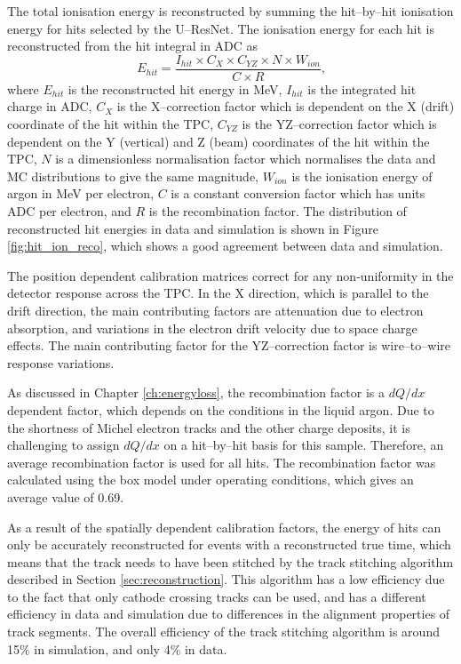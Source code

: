 The total ionisation energy is reconstructed by summing the hit--by--hit
ionisation energy for hits selected by the U--ResNet. The ionisation energy for
each hit is reconstructed from the hit integral in ADC as
\begin{equation*}
	E_{hit} = \frac{I_{hit} \times C_X \times C_{YZ} \times N \times W_{ion}}{C \times R}\mbox{,}
\end{equation*}
where $E_{hit}$ is the reconstructed hit energy in MeV, $I_{hit}$ is the
integrated hit charge in ADC, $C_X$ is the X--correction factor which is
dependent on the X (drift) coordinate of the hit within the TPC, $C_{YZ}$ is the
YZ--correction factor which is dependent on the Y (vertical) and Z (beam) 
coordinates of the hit within the TPC, $N$ is a dimensionless normalisation 
factor which normalises the data and MC distributions to give the same 
magnitude, $W_{ion}$ is the ionisation energy of argon in MeV per electron, 
$C$ is a constant conversion factor which has units ADC per electron, and $R$ 
is the recombination factor. The distribution of reconstructed hit energies in 
\protodune{} data and simulation is shown in Figure \ref{fig:hit_ion_reco}, 
which shows a good agreement between data and simulation.

The position dependent calibration matrices correct for any non-uniformity in 
the detector response across the TPC. In the X direction, which is parallel to 
the drift direction, the main contributing factors are attenuation due to 
electron absorption, and variations in the electron drift velocity due to 
space charge effects. The main contributing factor for the YZ--correction 
factor is wire--to--wire response variations.

As discussed in Chapter \ref{ch:energyloss}, the recombination factor is a
$dQ/dx$ dependent factor, which depends on the conditions in the liquid
argon. Due to the shortness of Michel electron tracks and the other charge
deposits, it is challenging to assign $dQ/dx$ on a hit--by--hit basis for this
sample. Therefore, an average recombination factor is used for all hits. The
recombination factor was calculated using the box model\cite{Acciarri2013a}
under \protodune{} operating conditions, which gives an average value of 0.69.

As a result of the spatially dependent calibration factors, the energy of hits
can only be accurately reconstructed for events with a reconstructed true
time, which means that the track needs to have been stitched by the track
stitching algorithm described in Section \ref{sec:reconstruction}. This 
algorithm has a low efficiency due to the fact that only cathode crossing 
tracks can be used, and has a different efficiency in data and simulation due 
to differences in the alignment properties of track segments. The overall 
efficiency of the track stitching algorithm is around 15\% in simulation, and 
only 4\% in data.


